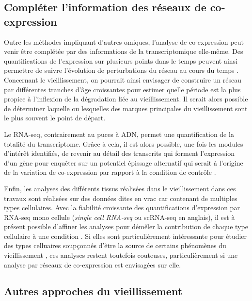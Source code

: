 \subsection{Compléter l'information des réseaux de co-expression}

Outre les méthodes impliquant d'autres omiques, l'analyse de co-expression peut venir être complétée par des informations de la transcriptomique elle-même. Des quantifications de l'expression sur plusieurs points dans le temps peuvent ainsi permettre de suivre l'évolution de perturbations du réseau au cours du temps \cite{Liu2013Dec}. Concernant le vieillissement, on pourrait ainsi envisager de construire un réseau par différentes tranches d'âge croissantes pour estimer quelle période est la plus propice à l'inflexion de la dégradation liée au vieillissement. Il serait alors possible de déterminer laquelle ou lesquelles des marques principales du vieillissement sont le plus souvent le point de départ.

Le RNA-seq, contrairement au puces à ADN, permet une quantification de la totalité du transcriptome. Grâce à cela, il est alors possible, une fois les modules d'intérêt identifiés, de revenir au détail des transcrits qui forment l'expression d'un gène pour enquêter sur un potentiel épissage alternatif qui serait à l'origine de la variation de co-expression par rapport à la condition de contrôle \cite{Saha2017Oct,Sun2021Jun}.

Enfin, les analyses des différents tissus réalisées dans le vieillissement dans ces travaux sont réalisées sur des données dites en vrac car contenant de multiples types cellulaires. Avec la fiabilité croissante des quantifications d'expression par RNA-seq mono cellule (\textit{single cell RNA-seq} ou scRNA-seq en anglais), il est à présent possible d'affiner les analyses pour démêler la contribution de chaque type cellulaire à une condition \cite{Chowdhury2019}. Si elles sont particulièrement intéressante pour étudier des types celluaires soupçonnés d'être la source de certains phénomènes du vieillissement \cite{Uyar2020,FonsecaCosta2020Dec,Menon2019Oct}, ces analyses restent toutefois couteuses, particulièrement si une analyse par réseaux de co-expression est envisagées sur elle.



\subsection{Autres approches du vieillissement}

